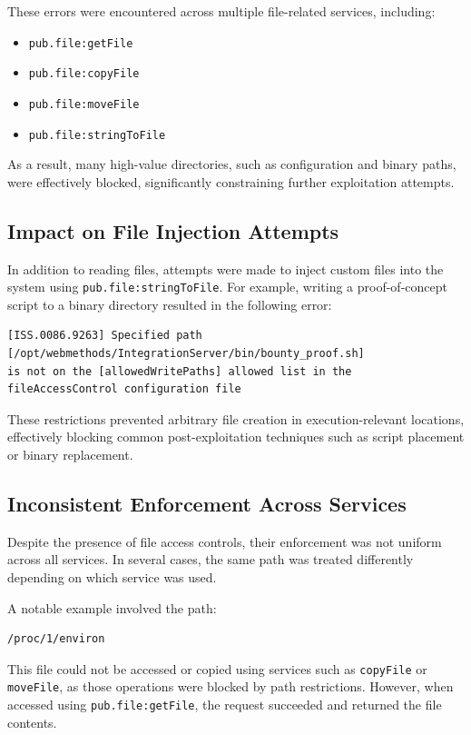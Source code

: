 \documentclass[12pt,a4paper]{report}
\begin{document}
These errors were encountered across multiple file-related services, including:
\begin{itemize}
	\item \texttt{pub.file:getFile}
	\item \texttt{pub.file:copyFile}
	\item \texttt{pub.file:moveFile}
	\item \texttt{pub.file:stringToFile}
\end{itemize}

As a result, many high-value directories, such as configuration and binary paths, were effectively blocked, significantly constraining further exploitation attempts.

\subsection{Impact on File Injection Attempts}

In addition to reading files, attempts were made to inject custom files into the system using \texttt{pub.file:stringToFile}. For example, writing a proof-of-concept script to a binary directory resulted in the following error:

\begin{verbatim}
[ISS.0086.9263] Specified path
[/opt/webmethods/IntegrationServer/bin/bounty_proof.sh]
is not on the [allowedWritePaths] allowed list in the
fileAccessControl configuration file
\end{verbatim}

These restrictions prevented arbitrary file creation in execution-relevant locations, effectively blocking common post-exploitation techniques such as script placement or binary replacement.

\subsection{Inconsistent Enforcement Across Services}

Despite the presence of file access controls, their enforcement was not uniform across all services. In several cases, the same path was treated differently depending on which service was used.

A notable example involved the path:

\begin{verbatim}
/proc/1/environ
\end{verbatim}

This file could not be accessed or copied using services such as \texttt{copyFile} or \texttt{moveFile}, as those operations were blocked by path restrictions. However, when accessed using \texttt{pub.file:getFile}, the request succeeded and returned the file contents.
\end{document}
